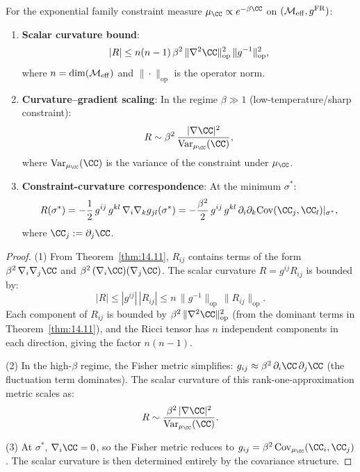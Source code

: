 \begin{theorem}
\label{thm:15.11}
For the exponential family constraint measure $\mu_{\CC} \propto
e^{-\beta\CC}$ on $(\mathcal{M}_{\mathrm{eff}}, g^{\mathrm{FR}})$:
\begin{enumerate}
  \item \textbf{Scalar curvature bound}:
        \begin{equation}\label{eq:curv-bound}
          |R| \leq n(n-1)\,\beta^2\,
          \|\nabla^2\CC\|_{\mathrm{op}}^2\,
          \|g^{-1}\|_{\mathrm{op}}^2,
        \end{equation}
        where $n = \dim(\mathcal{M}_{\mathrm{eff}})$ and
        $\|\cdot\|_{\mathrm{op}}$ is the operator norm.

  \item \textbf{Curvature--gradient scaling}:
        In the regime $\beta \gg 1$ (low-temperature/sharp constraint):
        \begin{equation}\label{eq:scaling-law}
          R \sim \beta^2\,\frac{|\nabla\CC|^2}
          {\mathrm{Var}_{\mu_\CC}(\CC)},
        \end{equation}
        where $\mathrm{Var}_{\mu_\CC}(\CC)$ is the variance of the
        constraint under $\mu_\CC$.

  \item \textbf{Constraint-curvature correspondence}: At the
        minimum $\sigma^*$:
        \begin{equation}\label{eq:curv-at-min}
          R(\sigma^*) = -\frac{1}{2}\,g^{ij}\,g^{kl}\,
          \nabla_i\nabla_k g_{jl}(\sigma^*)
          = -\frac{\beta^2}{2}\,g^{ij}\,g^{kl}\,
          \partial_i\partial_k\mathrm{Cov}(\CC_j, \CC_l)|_{\sigma^*},
        \end{equation}
        where $\CC_j := \partial_j\CC$.
\end{enumerate}
\end{theorem}

\begin{proof}
(1) From Theorem~\ref{thm:14.11}, $R_{ij}$ contains terms of the form
$\beta^2\,\nabla_i\nabla_j\CC$ and $\beta^2\,(\nabla_i\CC)
(\nabla_j\CC)$.  The scalar curvature $R = g^{ij}R_{ij}$ is bounded by:
\[
  |R| \leq |g^{ij}|\,|R_{ij}|
  \leq n\,\|g^{-1}\|_{\mathrm{op}}\,\|R_{ij}\|_{\mathrm{op}}.
\]
Each component of $R_{ij}$ is bounded by
$\beta^2\,\|\nabla^2\CC\|_{\mathrm{op}}^2$ (from the dominant terms
in Theorem~\ref{thm:14.11}), and the Ricci tensor has $n$ independent
components in each direction, giving the factor $n(n-1)$.

(2) In the high-$\beta$ regime, the Fisher metric simplifies:
$g_{ij} \approx \beta^2\,\partial_i\CC\,\partial_j\CC$ (the
fluctuation term dominates).  The scalar curvature of this
rank-one-approximation metric scales as:
\[
  R \sim \frac{\beta^2\,|\nabla\CC|^2}{\mathrm{Var}_{\mu_\CC}(\CC)}.
\]

(3) At $\sigma^*$, $\nabla_i\CC = 0$, so the Fisher metric reduces
to $g_{ij} = \beta^2\,\mathrm{Cov}_{\mu_\CC}(\CC_i, \CC_j)$.
The scalar curvature is then determined entirely by the covariance
structure.
\end{proof}

